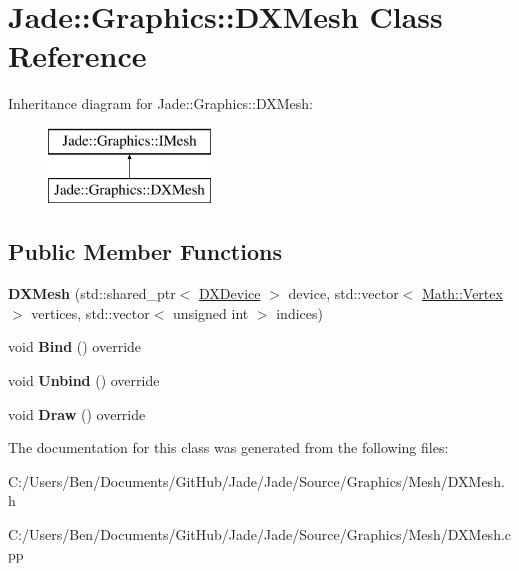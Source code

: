 \hypertarget{class_jade_1_1_graphics_1_1_d_x_mesh}{}\section{Jade\+:\+:Graphics\+:\+:D\+X\+Mesh Class Reference}
\label{class_jade_1_1_graphics_1_1_d_x_mesh}
Inheritance diagram for Jade\+:\+:Graphics\+:\+:D\+X\+Mesh\+:\begin{figure}[H]
\begin{center}
\leavevmode
\includegraphics[height=2.000000cm]{class_jade_1_1_graphics_1_1_d_x_mesh}
\end{center}
\end{figure}
\subsection*{Public Member Functions}
\begin{DoxyCompactItemize}
\item 
\hypertarget{class_jade_1_1_graphics_1_1_d_x_mesh_a4440d9c0e2b5f72d583ec4ea378ea52d}{}{\bfseries D\+X\+Mesh} (std\+::shared\+\_\+ptr$<$ \hyperlink{class_jade_1_1_graphics_1_1_d_x_device}{D\+X\+Device} $>$ device, std\+::vector$<$ \hyperlink{struct_jade_1_1_math_1_1_vertex}{Math\+::\+Vertex} $>$ vertices, std\+::vector$<$ unsigned int $>$ indices)\label{class_jade_1_1_graphics_1_1_d_x_mesh_a4440d9c0e2b5f72d583ec4ea378ea52d}

\item 
\hypertarget{class_jade_1_1_graphics_1_1_d_x_mesh_ad763a219177781f5acb91c6df3d14c3c}{}void {\bfseries Bind} () override\label{class_jade_1_1_graphics_1_1_d_x_mesh_ad763a219177781f5acb91c6df3d14c3c}

\item 
\hypertarget{class_jade_1_1_graphics_1_1_d_x_mesh_a6d57ce4600e327cfdafe38909e8e65c6}{}void {\bfseries Unbind} () override\label{class_jade_1_1_graphics_1_1_d_x_mesh_a6d57ce4600e327cfdafe38909e8e65c6}

\item 
\hypertarget{class_jade_1_1_graphics_1_1_d_x_mesh_a61dc93ef90c912c08cb5b7aaf33d234c}{}void {\bfseries Draw} () override\label{class_jade_1_1_graphics_1_1_d_x_mesh_a61dc93ef90c912c08cb5b7aaf33d234c}

\end{DoxyCompactItemize}


The documentation for this class was generated from the following files\+:\begin{DoxyCompactItemize}
\item 
C\+:/\+Users/\+Ben/\+Documents/\+Git\+Hub/\+Jade/\+Jade/\+Source/\+Graphics/\+Mesh/D\+X\+Mesh.\+h\item 
C\+:/\+Users/\+Ben/\+Documents/\+Git\+Hub/\+Jade/\+Jade/\+Source/\+Graphics/\+Mesh/D\+X\+Mesh.\+cpp\end{DoxyCompactItemize}
